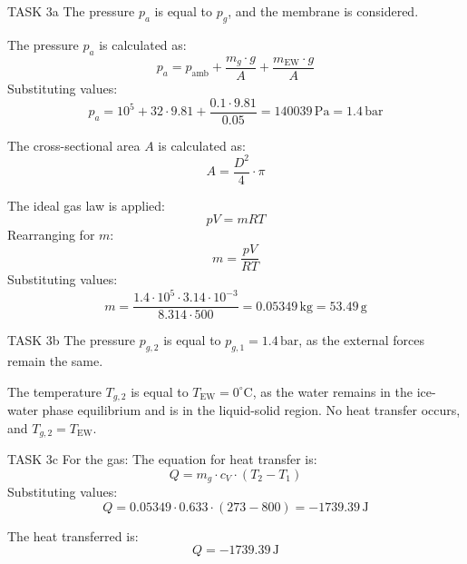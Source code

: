 TASK 3a  
The pressure \( p_a \) is equal to \( p_g \), and the membrane is considered.  

The pressure \( p_a \) is calculated as:  
\[
p_a = p_{\text{amb}} + \frac{m_g \cdot g}{A} + \frac{m_{\text{EW}} \cdot g}{A}
\]  
Substituting values:  
\[
p_a = 10^5 + 32 \cdot 9.81 + \frac{0.1 \cdot 9.81}{0.05} = 140039 \, \text{Pa} = 1.4 \, \text{bar}
\]  

The cross-sectional area \( A \) is calculated as:  
\[
A = \frac{D^2}{4} \cdot \pi
\]  

The ideal gas law is applied:  
\[
pV = mRT
\]  
Rearranging for \( m \):  
\[
m = \frac{pV}{RT}
\]  
Substituting values:  
\[
m = \frac{1.4 \cdot 10^5 \cdot 3.14 \cdot 10^{-3}}{8.314 \cdot 500} = 0.05349 \, \text{kg} = 53.49 \, \text{g}
\]  

TASK 3b  
The pressure \( p_{g,2} \) is equal to \( p_{g,1} = 1.4 \, \text{bar}\), as the external forces remain the same.  

The temperature \( T_{g,2} \) is equal to \( T_{\text{EW}} = 0^\circ\text{C}\), as the water remains in the ice-water phase equilibrium and is in the liquid-solid region. No heat transfer occurs, and \( T_{g,2} = T_{\text{EW}} \).  

TASK 3c  
For the gas:  
The equation for heat transfer is:  
\[
Q = m_g \cdot c_V \cdot (T_2 - T_1)
\]  
Substituting values:  
\[
Q = 0.05349 \cdot 0.633 \cdot (273 - 800) = -1739.39 \, \text{J}
\]  

The heat transferred is:  
\[
Q = -1739.39 \, \text{J}
\]